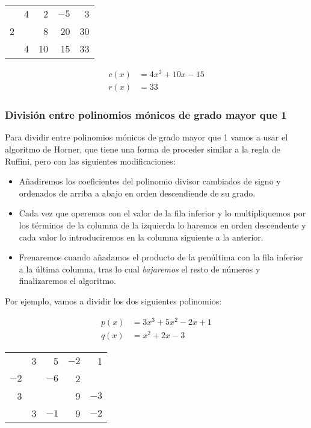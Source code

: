 \begin{center}
\setlength{\tabcolsep}{1ex}
\begin{tabular}{r | r r r r}
	  & 4 & 2  & $-5$ & 3  \\
	2 &   & 8  & 20   & 30 \\
	\hline
	  & 4 & 10 & 15   & 33
\end{tabular}
\end{center}

\[
\begin{array}{ll}
	c(x) & = 4x^2 + 10x - 15 \\
	r(x) & =              33
\end{array}
\]

\subsubsection{División entre polinomios mónicos de grado mayor que 1}

Para dividir entre polinomios mónicos de grado mayor que 1 vamos a usar el algoritmo de Horner, que tiene una forma de proceder similar a la regla de Ruffini, pero con las siguientes modificaciones:

\begin{itemize}
	\item
		Añadiremos los coeficientes del polinomio divisor cambiados de signo y ordenados de arriba a abajo en orden descendiende de su grado.
	\item
		Cada vez que operemos con el valor de la fila inferior y lo multipliquemos por los términos de la columna de la izquierda lo haremos en orden descendente y cada valor lo introduciremos en la columna siguiente a la anterior.
	\item
		Frenaremos cuando añadamos el producto de la penúltima con la fila inferior a la última columna, tras lo cual \textit{bajaremos} el resto de números y finalizaremos el algoritmo.
\end{itemize}

Por ejemplo, vamos a dividir los dos siguientes polinomios:

\[
\begin{array}{ll}
	p(x) & = 3x^3 + 5x^2 - 2x + 1 \\
	q(x) & =         x^2 + 2x - 3
\end{array}
\]

\begin{center}
\setlength{\tabcolsep}{1ex}
\begin{tabular}{r | r r r r}
	     & 3 & 5    & $-2$ & 1    \\
	$-2$ &   & $-6$ & 2    &      \\
	3    &   &      & 9    & $-3$ \\
	\hline
	     & 3 & $-1$ &  9   & $-2$
\end{tabular}
\end{center}

